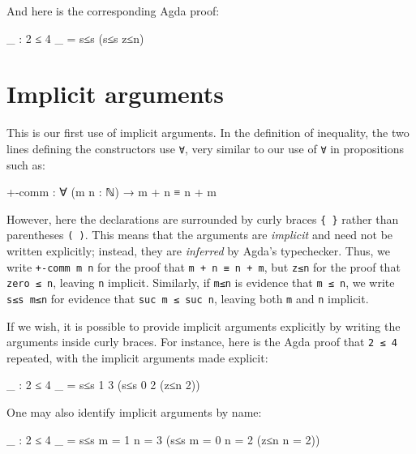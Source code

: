 And here is the corresponding Agda proof:

\begin{fence}
\begin{code}
_ : 2 ≤ 4
_ = s≤s (s≤s z≤n)
\end{code}
\end{fence}

\hypertarget{implicit-arguments}{%
\section{Implicit arguments}\label{implicit-arguments}}

This is our first use of implicit arguments. In the definition of
inequality, the two lines defining the constructors use \texttt{∀}, very
similar to our use of \texttt{∀} in propositions such as:

\begin{myDisplay}
+-comm : ∀ (m n : ℕ) → m + n ≡ n + m
\end{myDisplay}

However, here the declarations are surrounded by curly braces
\texttt{\{\ \}} rather than parentheses \texttt{(\ )}. This means that
the arguments are \emph{implicit} and need not be written explicitly;
instead, they are \emph{inferred} by Agda's typechecker. Thus, we write
\texttt{+-comm\ m\ n} for the proof that \texttt{m\ +\ n\ ≡\ n\ +\ m},
but \texttt{z≤n} for the proof that \texttt{zero\ ≤\ n}, leaving
\texttt{n} implicit. Similarly, if \texttt{m≤n} is evidence that
\texttt{m\ ≤\ n}, we write \texttt{s≤s\ m≤n} for evidence that
\texttt{suc\ m\ ≤\ suc\ n}, leaving both \texttt{m} and \texttt{n}
implicit.

If we wish, it is possible to provide implicit arguments explicitly by
writing the arguments inside curly braces. For instance, here is the
Agda proof that \texttt{2\ ≤\ 4} repeated, with the implicit arguments
made explicit:

\begin{fence}
\begin{code}
_ : 2 ≤ 4
_ = s≤s {1} {3} (s≤s {0} {2} (z≤n {2}))
\end{code}
\end{fence}

One may also identify implicit arguments by name:

\begin{fence}
\begin{code}
_ : 2 ≤ 4
_ = s≤s {m = 1} {n = 3} (s≤s {m = 0} {n = 2} (z≤n {n = 2}))
\end{code}
\end{fence}

